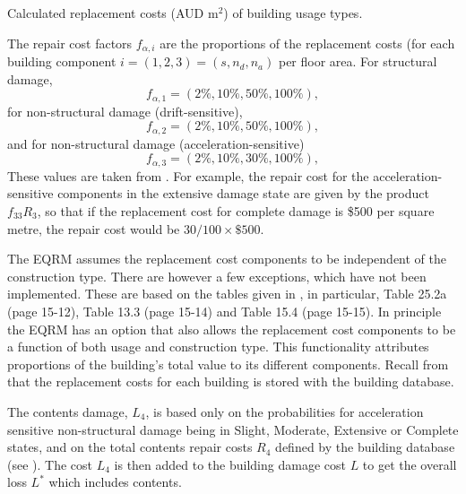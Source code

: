 \begin{table}[p]
\centering \caption{Calculated replacement costs (AUD
$\mathrm{m^2}$) of building
  usage types.}
  \vspace{0.8em}
\label{tab:replace_costs} \small

\end{table}


The repair cost factors $f_{\alpha, i}$
are the proportions of the replacement costs (for each building
component $i=(1,2,3)=(s, n_d, n_a)$  per floor area.
For structural damage,
\begin{equation}
 f_{\alpha, 1} = (2\%, 10\%, 50\%, 100\%),
\end{equation}
for non-structural damage (drift-sensitive),
\begin{equation}
 f_{\alpha, 2} = (2\%, 10\%, 50\%, 100\%),
\end{equation}
and for non-structural damage (acceleration-sensitive)
\begin{equation}
 f_{\alpha, 3} = (2\%, 10\%, 30\%, 100\%),
\end{equation}
These values are taken from \cite{dr_FEMA99b}. For example, the
repair cost for the acceleration-sensitive components in the
extensive damage state are given by the product $f_{33}R_3$, so
that if the replacement cost for complete damage is \$500 per
square metre, the repair cost would be $30/100\times\$500$.


The EQRM assumes the replacement cost components to be
independent of the construction type. There are however a few exceptions,
which have not been implemented. These are based on the tables
given in \cite{dr_FEMA99b}, in particular, Table 25.2a (page
15-12), Table 13.3 (page 15-14) and Table 15.4 (page 15-15). In
principle the EQRM has an option that also allows the replacement
cost components to be a function of both usage and construction
type. This functionality
attributes proportions of the building's total value to its
different components. Recall from
 that the replacement costs for
each building is stored with the building database.

The contents damage, $L_4$, is based only on the probabilities for
acceleration sensitive non-structural damage being in Slight,
Moderate, Extensive or Complete states, and on the total contents
repair costs $R_4$ defined by the building database (see ). The cost $L_4$
is then added to the building damage cost $L$ to get the overall
loss $L^*$ which includes contents.

